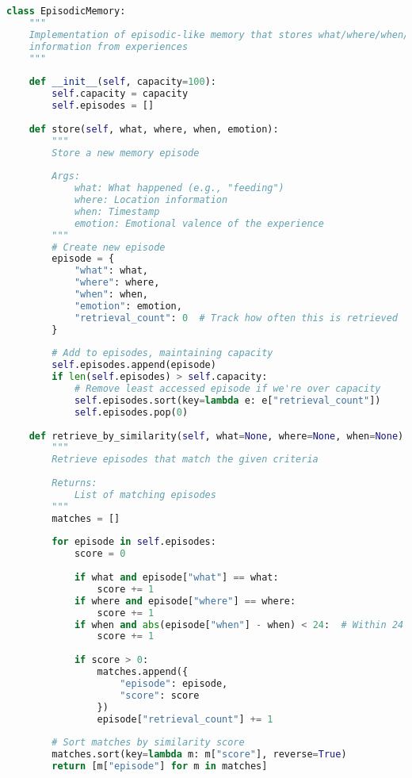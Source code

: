 \documentclass[11pt,a4paper]{article}
\begin{document}
\begin{lstlisting}[language=Python]
class EpisodicMemory:
    """
    Implementation of episodic-like memory that stores what/where/when/emotion
    information from experiences
    """
    
    def __init__(self, capacity=100):
        self.capacity = capacity
        self.episodes = []
        
    def store(self, what, where, when, emotion):
        """
        Store a new memory episode
        
        Args:
            what: What happened (e.g., "feeding")
            where: Location information
            when: Timestamp
            emotion: Emotional valence of the experience
        """
        # Create new episode
        episode = {
            "what": what,
            "where": where,
            "when": when,
            "emotion": emotion,
            "retrieval_count": 0  # Track how often this is retrieved
        }
        
        # Add to episodes, maintaining capacity
        self.episodes.append(episode)
        if len(self.episodes) > self.capacity:
            # Remove least accessed episode if we're over capacity
            self.episodes.sort(key=lambda e: e["retrieval_count"])
            self.episodes.pop(0)
            
    def retrieve_by_similarity(self, what=None, where=None, when=None):
        """
        Retrieve episodes that match the given criteria
        
        Returns:
            List of matching episodes
        """
        matches = []
        
        for episode in self.episodes:
            score = 0
            
            if what and episode["what"] == what:
                score += 1
            if where and episode["where"] == where:
                score += 1
            if when and abs(episode["when"] - when) < 24:  # Within 24 time units
                score += 1
                
            if score > 0:
                matches.append({
                    "episode": episode,
                    "score": score
                })
                episode["retrieval_count"] += 1
                
        # Sort matches by similarity score
        matches.sort(key=lambda m: m["score"], reverse=True)
        return [m["episode"] for m in matches]
        

\end{lstlisting}
\end{document}
